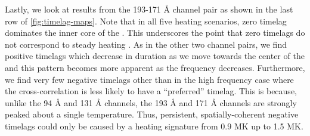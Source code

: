 Lastly, we look at results from the 193-171 \AA{} channel pair as shown in the last row of \autoref{fig:timelag-maps}. Note that in all five heating scenarios, zero timelag dominates the inner core of the \AR{}. This underscores the point that zero timelags do not correspond to steady heating \citep[see][]{viall_transition_2015,viall_signatures_2016}. As in the other two channel pairs, we find positive timelags which decrease in duration as we move towards the center of the \AR{} and this pattern becomes more apparent as the frequency decreases. Furthermore, we find very few negative timelags other than in the high frequency case where the cross-correlation is less likely to have a ``preferred'' timelag. This is because, unlike the 94 \AA{} and 131 \AA{} channels, the 193 \AA{} and 171 \AA{} channels are strongly peaked about a single temperature. Thus, persistent, spatially-coherent negative timelags could only be caused by a heating signature from 0.9 MK up to 1.5 MK. 


